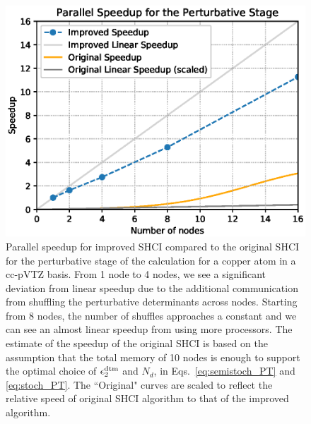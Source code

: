 \documentclass[%
preprint,
 superscriptaddress,
 amsmath,amssymb,
 aps,
]{revtex4-1}
\begin{document}
\begin{figure}[h]
  \includegraphics[width=\linewidth]{scalability/dtm.eps}
  \caption{
Parallel speedup for improved SHCI compared to the original SHCI for the perturbative stage of the
calculation for a copper atom in a cc-pVTZ basis.
From 1 node to 4 nodes, we see a significant deviation from linear speedup due to the additional communication from shuffling the perturbative determinants across nodes.
Starting from 8 nodes, the number of shuffles approaches a constant and we can see an almost linear speedup from using more processors.
The estimate of the speedup of the original SHCI is based on the assumption that the total memory of 10 nodes is enough to support
the optimal choice of $\epsilon_2^{\rm dtm}$ and $N_d$, in Eqs.~\ref{eq:semistoch_PT} and \ref{eq:stoch_PT}.
The ``Original" curves are scaled to reflect the relative speed of original SHCI algorithm to that of the improved algorithm.
}
  \label{fig:parapt}
\end{figure}

\end{document}
